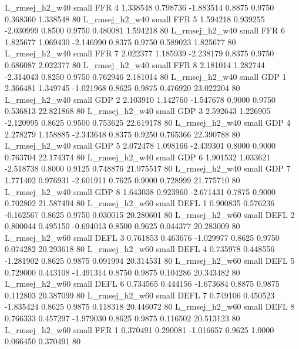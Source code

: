 L_rmsej_h2_w40      small      FFR                 4 1.338548 0.798736 -1.883514 0.8875 0.9750  0.368360    1.338548 80
L_rmsej_h2_w40      small      FFR                 5 1.594218 0.939255 -2.030999 0.8500 0.9750  0.480081    1.594218 80
L_rmsej_h2_w40      small      FFR                 6 1.825677 1.069430 -2.146990 0.8375 0.9750  0.589023    1.825677 80
L_rmsej_h2_w40      small      FFR                 7 2.022377 1.185939 -2.238179 0.8375 0.9750  0.686087    2.022377 80
L_rmsej_h2_w40      small      FFR                 8 2.181014 1.282744 -2.314043 0.8250 0.9750  0.762946    2.181014 80
L_rmsej_h2_w40      small      GDP                 1 2.366481 1.349745 -1.021968 0.8625 0.9875  0.476920   23.022204 80
L_rmsej_h2_w40      small      GDP                 2 2.103910 1.142760 -1.547678 0.9000 0.9750  0.536813   22.821868 80
L_rmsej_h2_w40      small      GDP                 3 2.592643 1.226905 -2.120995 0.8625 0.9500  0.753625   22.619178 80
L_rmsej_h2_w40      small      GDP                 4 2.278279 1.158885 -2.343648 0.8375 0.9250  0.765366   22.390788 80
L_rmsej_h2_w40      small      GDP                 5 2.072478 1.098166 -2.439301 0.8000 0.9000  0.763704   22.174374 80
L_rmsej_h2_w40      small      GDP                 6 1.901532 1.033621 -2.518738 0.8000 0.9125  0.748876   21.975517 80
L_rmsej_h2_w40      small      GDP                 7 1.771402 0.976931 -2.601911 0.7625 0.9000  0.728999   21.775710 80
L_rmsej_h2_w40      small      GDP                 8 1.643038 0.923960 -2.671431 0.7875 0.9000  0.702802   21.587494 80
L_rmsej_h2_w60      small     DEFL                 1 0.900835 0.576236 -0.162567 0.8625 0.9750  0.030015   20.280601 80
L_rmsej_h2_w60      small     DEFL                 2 0.800044 0.495150 -0.694013 0.8500 0.9625  0.044377   20.283009 80
L_rmsej_h2_w60      small     DEFL                 3 0.761853 0.463676 -1.029977 0.8625 0.9750  0.074282   20.293618 80
L_rmsej_h2_w60      small     DEFL                 4 0.735978 0.448556 -1.281902 0.8625 0.9875  0.091994   20.314531 80
L_rmsej_h2_w60      small     DEFL                 5 0.729000 0.443108 -1.491314 0.8750 0.9875  0.104286   20.343482 80
L_rmsej_h2_w60      small     DEFL                 6 0.734565 0.444156 -1.673684 0.8875 0.9875  0.112803   20.387099 80
L_rmsej_h2_w60      small     DEFL                 7 0.749106 0.450523 -1.835424 0.8625 0.9875  0.118318   20.446072 80
L_rmsej_h2_w60      small     DEFL                 8 0.766333 0.457297 -1.979030 0.8625 0.9875  0.116502   20.513123 80
L_rmsej_h2_w60      small      FFR                 1 0.370491 0.290081 -1.016657 0.9625 1.0000  0.066450    0.370491 80
